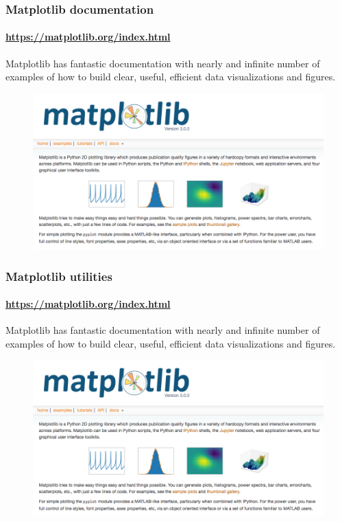 \documentclass[hyperref={colorlinks=true}]{beamer}
\begin{document}
\begin{frame}%
  \frametitle{Matplotlib documentation}
  \framesubtitle{\url{https://matplotlib.org/index.html}}
  
  Matplotlib has fantastic documentation with nearly and infinite number of examples of how to build clear, useful, efficient data visualizations and figures.
  
  \begin{figure}
    \centering
    \includegraphics[width=0.95\columnwidth]{matplotlib.png}
  \end{figure}

\end{frame}


\begin{frame}%
  \frametitle{Matplotlib utilities}
  \framesubtitle{\url{https://matplotlib.org/index.html}}
  
  Matplotlib has fantastic documentation with nearly and infinite number of examples of how to build clear, useful, efficient data visualizations and figures.
  
  \begin{figure}
    \centering
    \includegraphics[width=0.95\columnwidth]{matplotlib.png}
  \end{figure}

\end{frame}
\end{document}
